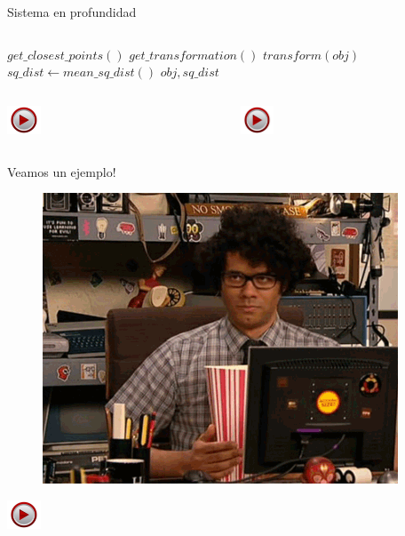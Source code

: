 \documentclass[]{beamer}
\newcommand{\video}[1]{
    \begin{center}
        \href{run:#1}{
            \includegraphics[width=1cm]{img/play.jpeg}
        }
    \end{center}
}
\begin{document}
\begin{frame}[fragile]{Sistema en profundidad}
\begin{columns}
\begin{column}{5cm}
{\begin{center}
                \end{center}
                \footnotesize
                \begin{algorithmic}
                    	\Loop
                    		\State $get\_closest\_points()$
                    		\State $get\_transformation()$
                    		\State $transform(obj)$
                    		\State $sq\_dist \gets mean\_sq\_dist()$
                    	\EndLoop
                        \State \Return $obj, sq\_dist$
                    \EndFunction
                \end{algorithmic}
                \normalsize

                \begin{columns}
                    \begin{column}{2cm}
                        \video{videos/taza_pre_icp.ogv}
                    \end{column}
                    \begin{column}{2cm}
                        \video{videos/taza_post_icp.ogv}
                    \end{column}
                \end{columns}
            }
        \end{column}

    \end{columns}

\end{frame}


\begin{frame}[t]{Veamos un ejemplo!}
    \begin{figure}[t]
        \centering
        \includegraphics[scale=0.5]{img/pochoclos/comiendo_2.png}
    \end{figure}
    \video{videos/seguimiento_depth.avi}
\end{frame}
\end{document}
